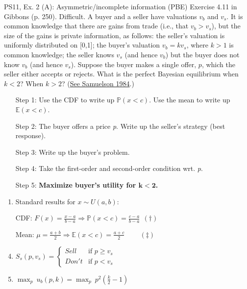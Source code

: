 \begin{frame}{PS11, Ex. 2 (A): Asymmetric/incomplete information (PBE)}
    Exercise 4.11 in Gibbons (p. 250). Difficult. A buyer and a seller have valuations $v_b$ and $v_s$. It is common knowledge that there are gains from trade (i.e., that $v_b > v_s$), but the size of the gains is private information, as follows: the seller’s valuation is uniformly distributed on [0,1]; the buyer’s valuation $v_b = kv_s$, where $k > 1$ is common knowledge; the seller knows $v_s$ (and hence $v_b$) but the buyer does not know $v_b$ (and hence $v_s$). Suppose the buyer makes a single offer, $p$, which the seller either accepts or rejects. What is the perfect Bayesian equilibrium when $k < 2$? When $k > 2$? (\href{https://www.jstor.org/stable/1911195}{See Samuelson 1984}.) \vspace{-8pt}
    \begin{multicols}{2}
      \begin{itemize}
        \item[Step 1:] Use the CDF to write up $\mathbb{P}(x<c)$. Use the mean to write up $\mathbb{E}(x<c)$.
        \item[Step 2:] The buyer offers a price \textit{p}. Write up the seller's strategy (best response).
        \item[Step 3:] Write up the buyer's problem.
        \item[Step 4:] Take the first-order and second-order condition wrt. \textit{p}.
        \item[Step 5:] \textbf{Maximize buyer's utility for $\bm{k<2}$.}
      \end{itemize}
      \vfill\null\columnbreak
      \begin{enumerate}
        \item Standard results for $x\sim U(a, b):$
        \item[CDF:] $F(x)=\frac{x-a}{b-a}\Rightarrow\mathbb{P}(x<c)=\frac{c-a}{b-a}\ \ (\dagger)$
        \item[Mean:] $\mu=\frac{a+b}{2}\Rightarrow\mathbb{E}(x<c)=\frac{a+c}{2}\quad\quad\ (\ddagger)$
        \item $S_s(p,v_s)=\left\{\begin{array}{ll}
          Sell  & \text{if }p\geq v_s \\
          Don't & \text{if }p < v_s
        \end{array}\right.$
        \item $\displaystyle{\max_p}\ u_b(p,k)=\displaystyle{\max_p}\ p^2\left(\frac{k}{2}-1\right)$

\end{enumerate}
\end{multicols}
\end{frame}

